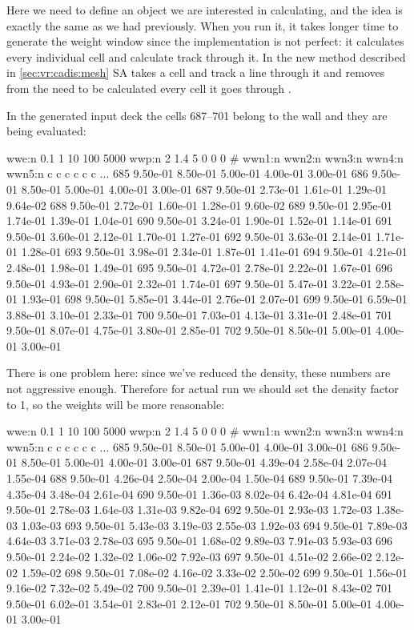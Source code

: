 Here we need to define an object we are interested in calculating, and the idea is exactly the same as we had previously.
When you run it, it takes longer time to generate the weight window since the implementation is not perfect: it calculates every individual cell and calculate track through it.
In the new method described in \ref{sec:vr:cadis:mesh} SA takes a cell and track a line through it and removes from the need to be calculated every cell it goes through .

In the generated input deck the cells 687--701 belong to the wall and they are being evaluated:
\begin{deck}
wwe:n 0.1 1 10 100 5000
wwp:n 2 1.4 5 0 0 0
#   wwn1:n  wwn2:n  wwn3:n  wwn4:n  wwn5:n
c   c        c        c        c        c
...
685   9.50e-01 8.50e-01 5.00e-01 4.00e-01 3.00e-01
686   9.50e-01 8.50e-01 5.00e-01 4.00e-01 3.00e-01
687   9.50e-01 2.73e-01 1.61e-01 1.29e-01 9.64e-02
688   9.50e-01 2.72e-01 1.60e-01 1.28e-01 9.60e-02
689   9.50e-01 2.95e-01 1.74e-01 1.39e-01 1.04e-01
690   9.50e-01 3.24e-01 1.90e-01 1.52e-01 1.14e-01
691   9.50e-01 3.60e-01 2.12e-01 1.70e-01 1.27e-01
692   9.50e-01 3.63e-01 2.14e-01 1.71e-01 1.28e-01
693   9.50e-01 3.98e-01 2.34e-01 1.87e-01 1.41e-01
694   9.50e-01 4.21e-01 2.48e-01 1.98e-01 1.49e-01
695   9.50e-01 4.72e-01 2.78e-01 2.22e-01 1.67e-01
696   9.50e-01 4.93e-01 2.90e-01 2.32e-01 1.74e-01
697   9.50e-01 5.47e-01 3.22e-01 2.58e-01 1.93e-01
698   9.50e-01 5.85e-01 3.44e-01 2.76e-01 2.07e-01
699   9.50e-01 6.59e-01 3.88e-01 3.10e-01 2.33e-01
700   9.50e-01 7.03e-01 4.13e-01 3.31e-01 2.48e-01
701   9.50e-01 8.07e-01 4.75e-01 3.80e-01 2.85e-01
702   9.50e-01 8.50e-01 5.00e-01 4.00e-01 3.00e-01
\end{deck}

There is one problem here: since we've reduced the density, these numbers are not aggressive enough.
Therefore for actual run we should set the density factor to 1, so the weights will be more reasonable:
\begin{deck}
wwe:n 0.1 1 10 100 5000
wwp:n 2 1.4 5 0 0 0
#   wwn1:n  wwn2:n  wwn3:n  wwn4:n  wwn5:n
c   c        c        c        c        c
...
685   9.50e-01 8.50e-01 5.00e-01 4.00e-01 3.00e-01
686   9.50e-01 8.50e-01 5.00e-01 4.00e-01 3.00e-01
687   9.50e-01 4.39e-04 2.58e-04 2.07e-04 1.55e-04
688   9.50e-01 4.26e-04 2.50e-04 2.00e-04 1.50e-04
689   9.50e-01 7.39e-04 4.35e-04 3.48e-04 2.61e-04
690   9.50e-01 1.36e-03 8.02e-04 6.42e-04 4.81e-04
691   9.50e-01 2.78e-03 1.64e-03 1.31e-03 9.82e-04
692   9.50e-01 2.93e-03 1.72e-03 1.38e-03 1.03e-03
693   9.50e-01 5.43e-03 3.19e-03 2.55e-03 1.92e-03
694   9.50e-01 7.89e-03 4.64e-03 3.71e-03 2.78e-03
695   9.50e-01 1.68e-02 9.89e-03 7.91e-03 5.93e-03
696   9.50e-01 2.24e-02 1.32e-02 1.06e-02 7.92e-03
697   9.50e-01 4.51e-02 2.66e-02 2.12e-02 1.59e-02
698   9.50e-01 7.08e-02 4.16e-02 3.33e-02 2.50e-02
699   9.50e-01 1.56e-01 9.16e-02 7.32e-02 5.49e-02
700   9.50e-01 2.39e-01 1.41e-01 1.12e-01 8.43e-02
701   9.50e-01 6.02e-01 3.54e-01 2.83e-01 2.12e-01
702   9.50e-01 8.50e-01 5.00e-01 4.00e-01 3.00e-01
\end{deck}

